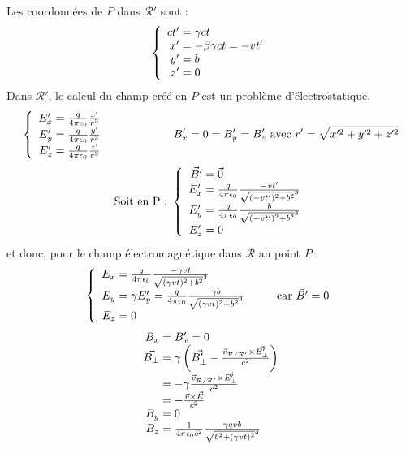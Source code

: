 \begin{app}
Les coordonnées de $P$ dans $\mathcal{R'}$ sont :
{\renewcommand*{\arraystretch}{1.2}$$
	\left\{ \begin{array}{r@{\;}l}
		ct'&=\gamma ct\\
		x'&=-\beta\gamma ct=-vt'\\
		y'&=b\\
		z'&=0
	\end{array} \right.
$$}
Dans $\mathcal{R'}$, le calcul du champ créé en $P$ est un problème d'électrostatique.
$$
	\left\{ \begin{array}{r@{\;}l}
		E'_x&=\frac{q}{4\pi\epsilon_0}\frac{x'}{r^3}\\
		E'_y&=\frac{q}{4\pi\epsilon_0}\frac{y'}{r^3}\\
		E'_z&=\frac{q}{4\pi\epsilon_0}\frac{z'}{r^3}
	\end{array} \right.	
	\kern 2cm B'_x=0=B'_y=B'_z\text{ avec }r'=\sqrt{x'^2+y'^2+z'^2}
$$
$$
	\text{Soit en P : }\left\{ \begin{array}{r@{\;}l}
		\vec{B}'&=\vec{0}\\
		E'_x&=\frac{q}{4\pi\epsilon_0}\frac{-vt'}{\sqrt{(-vt')^2+b^2}^3}\\
		E'_y&=\frac{q}{4\pi\epsilon_0}\frac{b}{\sqrt{(-vt')^2+b^2}^3}\\
		E'_z&=0
	\end{array} \right.
$$
et donc, pour le champ électromagnétique dans $\mathcal{R}$ au point $P$ :
$$
	\left\{ \begin{array}{r@{\;}l}
		E_x&=\frac{q}{4\pi\epsilon_0}\frac{-\gamma vt}{\sqrt{(\gamma vt)^2+b^2}^3}\\
		E_y&=\gamma E'_y=\frac{q}{4\pi\epsilon_0}\frac{\gamma b}{\sqrt{(\gamma vt)^2+b^2}^3}\kern 1cm \text{car }\vec{B}'=0\\
		E_z&=0
	\end{array} \right.	
$$
$$
	\begin{array}{r@{\;}l}
		B_x&=B'_x=0\\
		\vec{B_{\perp}}&=\gamma\left(\vec{B'_{\perp}}-\frac{\vec{ v}_{\mathcal{R}/\mathcal{R'}}\times\vec{E'_{\perp}}}{c^2}\right)\\
		&=-\gamma\frac{\vec{ v}_{\mathcal{R}/\mathcal{R'}}\times\vec{E'_{\perp}}}{c^2}\\
		&=-\frac{\vec{v}\times\vec{E}}{c^2}\\
		B_y&=0\\
		B_z&=\frac{1}{4\pi\epsilon_0 c^2}\frac{\gamma qvb}{\sqrt{b^2+(\gamma vt)^2}^3}
	\end{array}
$$
\end{app}

